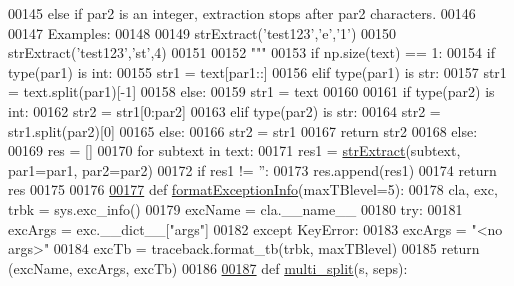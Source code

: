 \begin{DoxyCode}
{{{{00145 \textcolor{stringliteral}{    else if par2 is an integer, extraction stops after par2 characters.}
00146 \textcolor{stringliteral}{    }
00147 \textcolor{stringliteral}{    Examples: }
00148 \textcolor{stringliteral}{    }
00149 \textcolor{stringliteral}{    strExtract('test123','e','1')}
00150 \textcolor{stringliteral}{    strExtract('test123','st',4)}
00151 \textcolor{stringliteral}{    }
00152 \textcolor{stringliteral}{    """}
00153     \textcolor{keywordflow}{if} np.size(text) == 1:
00154         \textcolor{keywordflow}{if} type(par1) \textcolor{keywordflow}{is} int:
00155             str1 = text[par1::]
00156         \textcolor{keywordflow}{elif} type(par1) \textcolor{keywordflow}{is} str:
00157             str1 = text.split(par1)[-1]
00158         \textcolor{keywordflow}{else}:
00159             str1 = text
00160     
00161         \textcolor{keywordflow}{if} type(par2) \textcolor{keywordflow}{is} int:
00162             str2 = str1[0:par2]
00163         \textcolor{keywordflow}{elif} type(par2) \textcolor{keywordflow}{is} str:
00164             str2 = str1.split(par2)[0]
00165         \textcolor{keywordflow}{else}:
00166             str2 = str1
00167         \textcolor{keywordflow}{return} str2
00168     \textcolor{keywordflow}{else}:
00169         res = []
00170         \textcolor{keywordflow}{for} subtext \textcolor{keywordflow}{in} text:
00171             res1 = \hyperlink{namespacepyneb_1_1utils_1_1misc_aaf9c5249e3c3104e38854ca30f9df4b7}{strExtract}(subtext, par1=par1, par2=par2)
00172             \textcolor{keywordflow}{if} res1 != \textcolor{stringliteral}{''}:
00173                 res.append(res1)
00174         \textcolor{keywordflow}{return} res
00175 
00176 
\hypertarget{misc_8py_source_l00177}{}\hyperlink{namespacepyneb_1_1utils_1_1misc_ab2eb7efdb086136e683e7f05f17958a9}{00177} \textcolor{keyword}{def }\hyperlink{namespacepyneb_1_1utils_1_1misc_ab2eb7efdb086136e683e7f05f17958a9}{formatExceptionInfo}(maxTBlevel=5):
00178     cla, exc, trbk = sys.exc\_info()
00179     excName = cla.\_\_name\_\_
00180     \textcolor{keywordflow}{try}:
00181         excArgs = exc.\_\_dict\_\_[\textcolor{stringliteral}{"args"}]
00182     \textcolor{keywordflow}{except} KeyError:
00183         excArgs = \textcolor{stringliteral}{"<no args>"}
00184     excTb = traceback.format\_tb(trbk, maxTBlevel)
00185     \textcolor{keywordflow}{return} (excName, excArgs, excTb)
00186 
\hypertarget{misc_8py_source_l00187}{}\hyperlink{namespacepyneb_1_1utils_1_1misc_a4fc4f061f0c41f29de52ec765f894faf}{00187} \textcolor{keyword}{def }\hyperlink{namespacepyneb_1_1utils_1_1misc_a4fc4f061f0c41f29de52ec765f894faf}{multi\_split}(s, seps):
}}}}
\end{DoxyCode}
